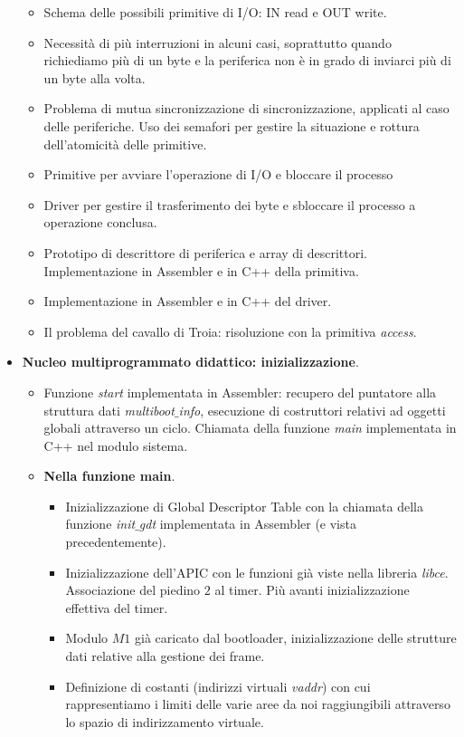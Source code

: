 \begin{itemize}
\begin{itemize}
		\item Schema delle possibili primitive di I/O: IN read e OUT write. 
		\item Necessità di più interruzioni in alcuni casi, soprattutto quando richiediamo più di un byte e la periferica non è in grado di inviarci più di un byte alla volta. 
		\item Problema di mutua sincronizzazione di sincronizzazione, applicati al caso delle periferiche. Uso dei semafori per gestire la situazione e rottura dell'atomicità delle primitive.
		\item Primitive per avviare l'operazione di I/O e bloccare il processo
		\item Driver per gestire il trasferimento dei byte e sbloccare il processo a operazione conclusa.
		\item Prototipo di descrittore di periferica e array di descrittori. Implementazione in Assembler e in C++ della primitiva.
		\item Implementazione in Assembler e in C++ del driver.
		\item Il problema del cavallo di Troia: risoluzione con la primitiva \emph{access}.
	\end{itemize}
	\item \textbf{Nucleo multiprogrammato didattico: inizializzazione}.
	\begin{itemize}
		\item Funzione \emph{start} implementata in Assembler: recupero del puntatore alla struttura dati \emph{multiboot$\_$info}, esecuzione di costruttori relativi ad oggetti globali attraverso un ciclo. Chiamata della funzione \emph{main} implementata in C++ nel modulo sistema. 
		\item \textbf{Nella funzione main}.
		\begin{itemize}
			\item Inizializzazione di Global Descriptor Table con la chiamata della funzione \emph{init$\_$gdt} implementata in Assembler (e vista precedentemente).
			\item Inizializzazione dell'APIC con le funzioni già viste nella libreria \emph{libce}. Associazione del piedino $2$ al timer. Più avanti inizializzazione effettiva del timer.
			\item Modulo $M1$ già caricato dal bootloader, inizializzazione delle strutture dati relative alla gestione dei frame. 
			\item Definizione di costanti (indirizzi virtuali \emph{vaddr}) con cui rappresentiamo i limiti delle varie aree da noi raggiungibili attraverso lo spazio di indirizzamento virtuale. 

\end{itemize}
\end{itemize}
\end{itemize}
